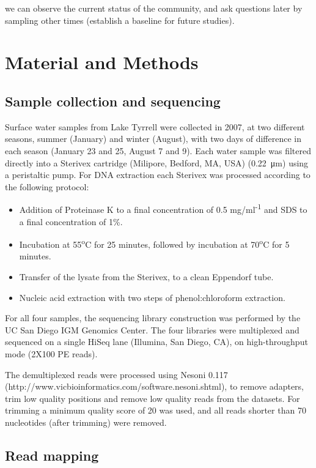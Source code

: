 we can observe the current status of the community, and ask questions later by sampling other times (establish a baseline for future studies).

\section{Material and Methods}

\subsection{Sample collection and sequencing}
Surface water samples from Lake Tyrrell were collected in 2007, at two different seasons, summer (January) and winter (August), with two days of difference in each season (January 23 and 25, August 7 and 9). Each water sample was filtered directly into a Sterivex cartridge (Milipore, Bedford, MA, USA) (\SI{0.22}{\micro\meter}) using a peristaltic pump. For DNA extraction each Sterivex was processed according to the following protocol:
\begin{itemize}
\item Addition of Proteinase K to a final concentration of 0.5 mg/ml\textsuperscript{-1} and SDS to a final concentration of 1\%.
\item Incubation at 55\textsuperscript{o}C for 25 minutes, followed by incubation at 70\textsuperscript{o}C for 5 minutes.
\item Transfer of the lysate from the Sterivex, to a clean Eppendorf tube.
\item Nucleic acid extraction with two steps of phenol:chloroform extraction. 
\end{itemize}

For all four samples, the sequencing library construction was performed by the UC San Diego IGM Genomics Center. The four libraries were multiplexed and sequenced on a single HiSeq lane (Illumina, San Diego, CA), on high-throughput mode (2X100 PE reads).

The demultiplexed reads were processed using Nesoni 0.117 (http://www.vicbioinformatics.com/software.nesoni.shtml), to remove adapters, trim low quality positions and remove low quality reads from the datasets. For trimming a minimum quality score of 20 was used, and all reads shorter than 70 nucleotides (after trimming) were removed.

\subsection{Read mapping}

